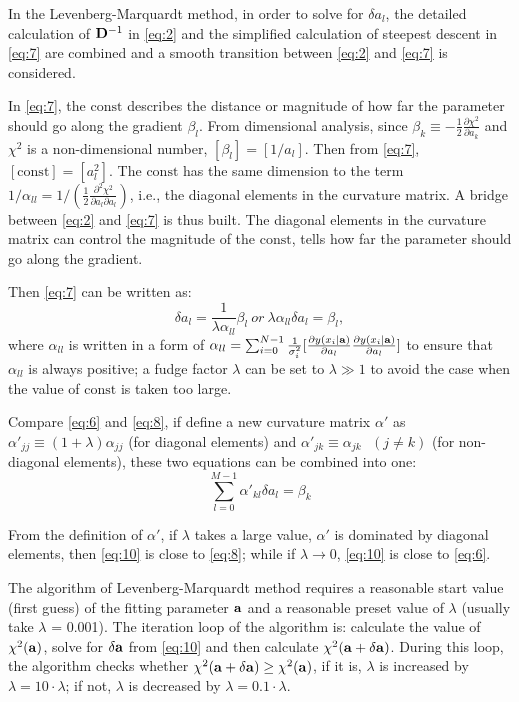 In the Levenberg-Marquardt method, in order to solve for $\delta a_l$, the detailed calculation of ${\bf D}^{-1}$ in \ref{eq:2} and the simplified calculation of steepest descent in \ref{eq:7} are combined and a smooth transition between \ref{eq:2} and \ref{eq:7} is considered.

In \ref{eq:7}, the $\mathrm{const}$ describes the distance or magnitude of how far the parameter should go along the gradient $\beta_l$. From dimensional analysis, since $\beta_k\equiv-\frac{1}{2}\frac{\partial\chi^2}{\partial a_k}$ and $\chi^2$ is a non-dimensional number, $[\beta_l]=[1/a_l]$. Then from \ref{eq:7}, $[\mathrm{const}]=[a^2_l]$. The $\mathrm{const}$ has the same dimension to the term $1/\alpha_{ll}= 1/(\frac{1}{2}\frac{\partial^2\chi^2}{\partial a_l\partial a_l})$, i.e., the diagonal elements in the curvature matrix. A bridge between \ref{eq:2} and \ref{eq:7} is thus built. The diagonal elements in the curvature matrix can control the magnitude of the $\mathrm{const}$, tells how far the parameter should go along the gradient. 

Then \ref{eq:7} can be written as:
\begin{equation}\label{eq:8}
\delta a_l = \frac{1}{\lambda \alpha_{ll}}\beta_l~or~\lambda \alpha_{ll}\delta a_l = \beta_l, 
\end{equation} 
where $\alpha_{ll}$ is written in a form of $\alpha_{ll}=\sum_{i=0}^{N-1}\frac{1}{\sigma^2_i}[\frac{\partial y(x_i|{\bf a})}{\partial a_l} \frac{\partial y(x_i|{\bf a})}{\partial a_l}]$ to ensure that $\alpha_{ll}$ is always positive; a fudge factor $\lambda$ can be set to $\lambda \gg 1$ to avoid the case when the value of $\mathrm{const}$ is taken too large.

Compare \ref{eq:6} and \ref{eq:8}, if define a new curvature matrix $\alpha'$ as $\alpha'_{jj}\equiv (1+\lambda)\alpha_{jj}$ (for diagonal  elements) and $\alpha'_{jk}\equiv \alpha_{jk}~~~(j\neq k)$ (for non-diagonal elements), these two equations can be combined into one: 
\begin{equation}\label{eq:10}
\sum_{l=0}^{M-1}\alpha'_{kl}\delta a_l = \beta_k
\end{equation}

From the definition of $\alpha'$, if $\lambda$ takes a large value, $\alpha'$ is dominated by diagonal elements, then \ref{eq:10} is close to \ref{eq:8}; while if $\lambda\to0$,  \ref{eq:10} is close to \ref{eq:6}.

The algorithm of Levenberg-Marquardt method requires a reasonable start value (first guess) of the fitting parameter $\bf a$ and a reasonable preset value of $\lambda$ (usually take $\lambda$ = 0.001). 
The iteration loop of the algorithm is: calculate the value of $\chi^2({\bf a})$, solve for $\bf \delta a$ from \ref{eq:10} and then calculate $\chi^2({\bf a+\delta a})$. During this loop, the algorithm checks whether $\chi^2({\bf a+\delta a})\geq\chi^2({\bf a})$, if it is, $\lambda$ is increased by $\lambda=10\cdot\lambda$; if not, $\lambda$ is decreased by $\lambda=0.1\cdot\lambda$.  

